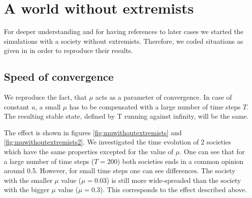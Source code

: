 \documentclass[11pt]{article}
\begin{document}
\section{A world without extremists}
For deeper understanding and for having references to later cases we started the simulations with a society without extremists. Therefore, we coded situations as given in \cite{Minor} in order to reproduce their results.

\subsection{Speed of convergence}
We reproduce the fact, that $\mu$ acts as a parameter of convergence. In case of constant $u$, a small $\mu$ has to be compensated with a large number of time steps $T$. The resulting stable state, defined by T running against infinity, will be the same.

The effect is shown in figures \ref{fig:muwithoutextremists} and \ref{fig:muwithoutextremists2}. We investigated the time evolution of 2 societies which have the same properties excepted for the value of $\mu$. One can see that for a large number of time steps ($T=200$) both societies ends in a common opinion around 0.5. However, for small time steps one can see differences. The society with the smaller $\mu$ value ($\mu = 0.03$) is still more wide-spreaded than the society with the bigger $\mu$ value ($\mu = 0.3$). This corresponds to the effect described above.
\end{document}
